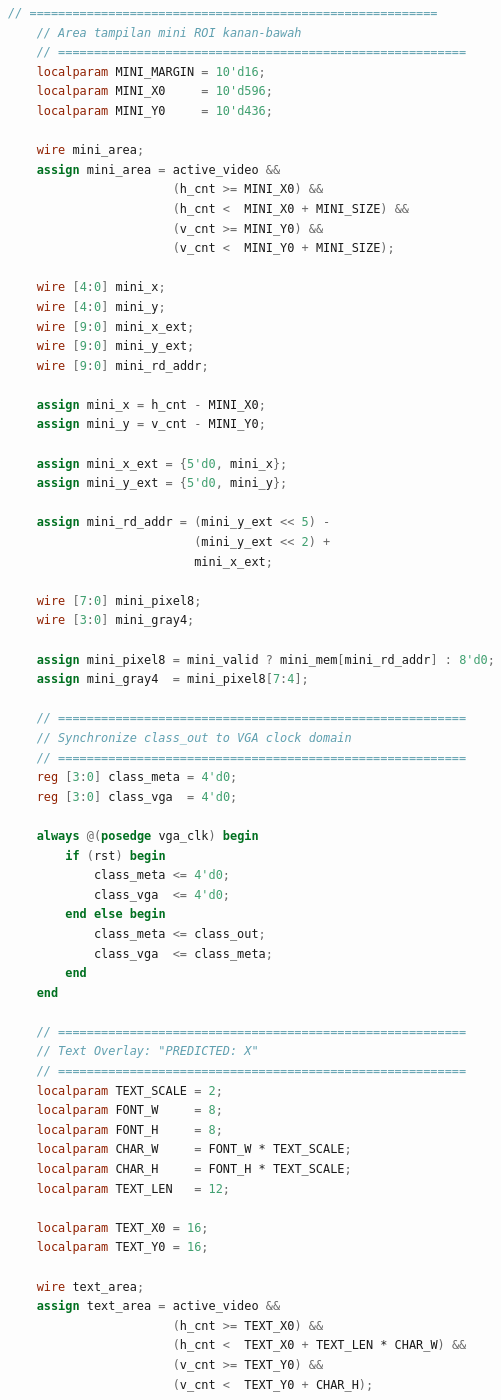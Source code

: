 \begin{lstlisting}[language=Verilog, title={Kode untuk menampilkan data hasil vga ke monitor}, label={code:vga-rgb-565}]
    // =========================================================
    // Area tampilan mini ROI kanan-bawah
    // =========================================================
    localparam MINI_MARGIN = 10'd16;
    localparam MINI_X0     = 10'd596;
    localparam MINI_Y0     = 10'd436;

    wire mini_area;
    assign mini_area = active_video &&
                       (h_cnt >= MINI_X0) &&
                       (h_cnt <  MINI_X0 + MINI_SIZE) &&
                       (v_cnt >= MINI_Y0) &&
                       (v_cnt <  MINI_Y0 + MINI_SIZE);

    wire [4:0] mini_x;
    wire [4:0] mini_y;
    wire [9:0] mini_x_ext;
    wire [9:0] mini_y_ext;
    wire [9:0] mini_rd_addr;

    assign mini_x = h_cnt - MINI_X0;
    assign mini_y = v_cnt - MINI_Y0;

    assign mini_x_ext = {5'd0, mini_x};
    assign mini_y_ext = {5'd0, mini_y};

    assign mini_rd_addr = (mini_y_ext << 5) -
                          (mini_y_ext << 2) +
                          mini_x_ext;

    wire [7:0] mini_pixel8;
    wire [3:0] mini_gray4;

    assign mini_pixel8 = mini_valid ? mini_mem[mini_rd_addr] : 8'd0;
    assign mini_gray4  = mini_pixel8[7:4];

    // =========================================================
    // Synchronize class_out to VGA clock domain
    // =========================================================
    reg [3:0] class_meta = 4'd0;
    reg [3:0] class_vga  = 4'd0;

    always @(posedge vga_clk) begin
        if (rst) begin
            class_meta <= 4'd0;
            class_vga  <= 4'd0;
        end else begin
            class_meta <= class_out;
            class_vga  <= class_meta;
        end
    end

    // =========================================================
    // Text Overlay: "PREDICTED: X"
    // =========================================================
    localparam TEXT_SCALE = 2;
    localparam FONT_W     = 8;
    localparam FONT_H     = 8;
    localparam CHAR_W     = FONT_W * TEXT_SCALE;
    localparam CHAR_H     = FONT_H * TEXT_SCALE;
    localparam TEXT_LEN   = 12;

    localparam TEXT_X0 = 16;
    localparam TEXT_Y0 = 16;

    wire text_area;
    assign text_area = active_video &&
                       (h_cnt >= TEXT_X0) &&
                       (h_cnt <  TEXT_X0 + TEXT_LEN * CHAR_W) &&
                       (v_cnt >= TEXT_Y0) &&
                       (v_cnt <  TEXT_Y0 + CHAR_H);


\end{lstlisting}
